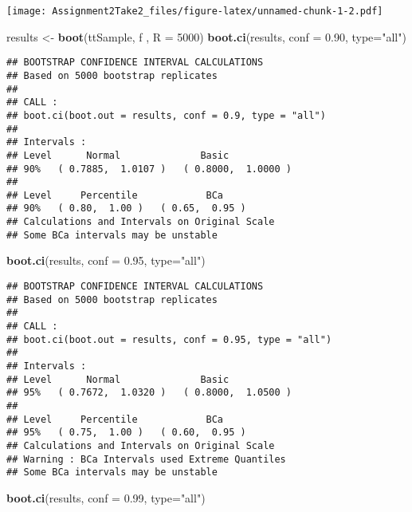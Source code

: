 \documentclass[]{article}
\newenvironment{Shaded}{\begin{snugshade}}{\end{snugshade}}
\newcommand{\KeywordTok}[1]{\textcolor[rgb]{0.13,0.29,0.53}{\textbf{#1}}}
\newcommand{\DataTypeTok}[1]{\textcolor[rgb]{0.13,0.29,0.53}{#1}}
\newcommand{\DecValTok}[1]{\textcolor[rgb]{0.00,0.00,0.81}{#1}}
\newcommand{\FloatTok}[1]{\textcolor[rgb]{0.00,0.00,0.81}{#1}}
\newcommand{\StringTok}[1]{\textcolor[rgb]{0.31,0.60,0.02}{#1}}
\newcommand{\NormalTok}[1]{#1}
\begin{document}
\texttt{[image: Assignment2Take2\_files/figure-latex/unnamed-chunk-1-2.pdf]}

\begin{Shaded}
\begin{Highlighting}[]
\NormalTok{results <-}\StringTok{ }\KeywordTok{boot}\NormalTok{(ttSample, f , }\DataTypeTok{R =} \DecValTok{5000}\NormalTok{)}
\KeywordTok{boot.ci}\NormalTok{(results, }\DataTypeTok{conf =} \FloatTok{0.90}\NormalTok{, }\DataTypeTok{type=}\StringTok{"all"}\NormalTok{)}
\end{Highlighting}
\end{Shaded}

\begin{verbatim}
## BOOTSTRAP CONFIDENCE INTERVAL CALCULATIONS
## Based on 5000 bootstrap replicates
## 
## CALL : 
## boot.ci(boot.out = results, conf = 0.9, type = "all")
## 
## Intervals : 
## Level      Normal              Basic         
## 90%   ( 0.7885,  1.0107 )   ( 0.8000,  1.0000 )  
## 
## Level     Percentile            BCa          
## 90%   ( 0.80,  1.00 )   ( 0.65,  0.95 )  
## Calculations and Intervals on Original Scale
## Some BCa intervals may be unstable
\end{verbatim}

\begin{Shaded}
\begin{Highlighting}[]
\KeywordTok{boot.ci}\NormalTok{(results, }\DataTypeTok{conf =} \FloatTok{0.95}\NormalTok{, }\DataTypeTok{type=}\StringTok{"all"}\NormalTok{)}
\end{Highlighting}
\end{Shaded}

\begin{verbatim}
## BOOTSTRAP CONFIDENCE INTERVAL CALCULATIONS
## Based on 5000 bootstrap replicates
## 
## CALL : 
## boot.ci(boot.out = results, conf = 0.95, type = "all")
## 
## Intervals : 
## Level      Normal              Basic         
## 95%   ( 0.7672,  1.0320 )   ( 0.8000,  1.0500 )  
## 
## Level     Percentile            BCa          
## 95%   ( 0.75,  1.00 )   ( 0.60,  0.95 )  
## Calculations and Intervals on Original Scale
## Warning : BCa Intervals used Extreme Quantiles
## Some BCa intervals may be unstable
\end{verbatim}

\begin{Shaded}
\begin{Highlighting}[]
\KeywordTok{boot.ci}\NormalTok{(results, }\DataTypeTok{conf =} \FloatTok{0.99}\NormalTok{, }\DataTypeTok{type=}\StringTok{"all"}\NormalTok{)}
\end{Highlighting}
\end{Shaded}
\end{document}
